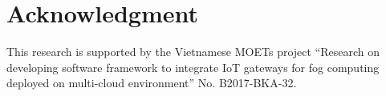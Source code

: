 \documentclass[conference]{IEEEtran}
\begin{document}
\section*{Acknowledgment} This research is supported by the Vietnamese MOETs project ``Research on developing software framework to integrate IoT gateways for fog computing deployed on multi-cloud environment'' No. B2017-BKA-32.

%

%
%
%
\end{document}
